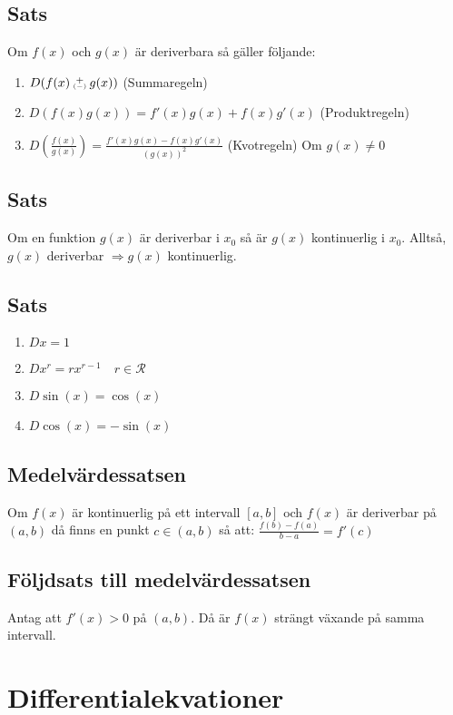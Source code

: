 \documentclass{article}
\newcommand\varpm{\mathbin{\vcenter{\hbox{%
  \oalign{\hfil$\scriptstyle+$\hfil\cr
          \noalign{\kern-.3ex}
          $\scriptscriptstyle({-})$\cr}%
}}}}
\begin{document}
\subsection{Sats}
Om $f(x)$ och $g(x)$ är deriverbara så gäller följande:

\begin{enumerate}
   \item $D(f(x)\varpm g(x))$ (Summaregeln)
   \item $D(f(x)g(x))=f'(x)g(x)+f(x)g'(x)$ (Produktregeln)
   \item $D(\frac{f(x)}{g(x)})=\frac{f'(x)g(x)-f(x)g'(x)}{(g(x))^2}$ (Kvotregeln) Om $g(x)\neq 0$
\end{enumerate}

\subsection{Sats}
Om en funktion $g(x)$ är deriverbar i $x_{0}$ så är $g(x)$ kontinuerlig i $x_{0}$. Alltså,\\
$g(x)$ deriverbar $\Rightarrow g(x)$ kontinuerlig.

\subsection{Sats}
\begin{enumerate}
   \item $Dx=1$
   \item $Dx^r=rx^{r-1} \quad r \in \mathcal{R}$
   \item $D\sin(x)=\cos(x)$
   \item $D\cos(x)=-\sin(x)$
\end{enumerate}

\subsection{Medelvärdessatsen}
Om $f(x)$ är kontinuerlig på ett intervall $[a,b]$ och $f(x)$ är deriverbar på $(a,b)$ då finns en punkt $c\in (a,b)$ så att: $\frac{f(b)-f(a)}{b-a}=f'(c)$

\subsection{Följdsats till medelvärdessatsen}
Antag att $f'(x)>0$ på $(a,b)$. Då är $f(x)$ strängt växande på samma intervall.

\newpage
\section{Differentialekvationer}
\end{document}
